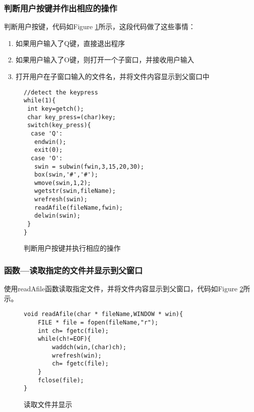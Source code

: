 \subsubsection{判断用户按键并作出相应的操作}
判断用户按键，代码如Figure \ref{Curses_keypress}所示，这段代码做了这些事情：
\begin{enumerate}
\item
如果用户输入了Q键，直接退出程序
\item
如果用户输入了O键，则打开一个子窗口，并接收用户输入
\item
打开用户在子窗口输入的文件名，并将文件内容显示到父窗口中
\end{enumerate}

\begin{figure}
\begin{lstlisting}
//detect the keypress
while(1){
 int key=getch();
 char key_press=(char)key;
 switch(key_press){
  case 'Q':
   endwin();
   exit(0);
  case 'O':
   swin = subwin(fwin,3,15,20,30);
   box(swin,'#','#');
   wmove(swin,1,2);
   wgetstr(swin,fileName);	
   wrefresh(swin);
   readAfile(fileName,fwin);
   delwin(swin);
 }
}
\end{lstlisting}
\caption{判断用户按键并执行相应的操作}
\label{Curses_keypress}
\end{figure}
\subsubsection{函数---读取指定的文件并显示到父窗口}
使用readAfile函数读取指定文件，并将文件内容显示到父窗口，代码如Figure \ref{Curses_readandview}所示。
\begin{figure}
\begin{lstlisting}
void readAfile(char * fileName,WINDOW * win){
	FILE * file = fopen(fileName,"r");
	int ch= fgetc(file);
	while(ch!=EOF){
		waddch(win,(char)ch);
		wrefresh(win);
		ch= fgetc(file);
	}	
	fclose(file);
}
\end{lstlisting}
\caption{读取文件并显示}
\label{Curses_readandview}
\end{figure}